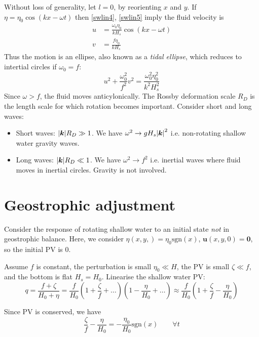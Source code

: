 \documentclass{jknotes}
\newcommand{\sgn}{\text{sgn}}
\begin{document}
Without loss of generality, let $l = 0$, by reorienting $x$ and $y$. If $\eta
= \eta_0 \cos(kx-\omega t)$ then \eqref{swlin4}, \eqref{swlin5} imply the
fluid velocity is
\begin{align}
	u &= \frac{\omega_0 \eta_0}{k H_s} \cos(kx-\omega t) \\
	v &= \frac{f \eta_0}{k H_s}
\end{align}
Thus the motion is an ellipse, also known as a \emph{tidal ellipse}, which
reduces to intertial circles if $\omega_0 = f$:
\begin{equation}
	u^2 + \frac{\omega_0^2}{f^2} v^2 = \frac{\omega_0^2 \eta_0^2}{k^2 H_s^2}
\end{equation}
Since $\omega > f$, the fluid moves anticylonically. The Rossby deformation
scale $R_D$ is the length scale for which rotation becomes important. Consider
short and long waves:
\begin{itemize}
	\item Short waves: $\abs{\bm{k}} R_D \gg 1$. We have $\omega^2 \to g H_s
		\abs{\bm{k}}^2$ i.e. non-rotating shallow water gravity waves.
	\item Long waves: $\abs{\bm{k}}R_D \ll 1$. We have $\omega^2 \to f^2$ i.e.
		inertial waves where fluid moves in inertial circles. Gravity is not
		involved.
\end{itemize}

\section{Geostrophic adjustment}
Consider the response of rotating shallow water to an initial state \emph{not}
in geostrophic balance. Here, we consider $\eta(x,y,) = \eta_0 \sgn(x)$,
$\bm{u}(x,y,0) = \bm{0}$, so the initial PV is $0$. 


Assume $f$ is constant, the perturbation is small $\eta_0 \ll H$, the PV is
small $\zeta \ll f$, and the bottom is flat $H_s = H_0$. Linearise the shallow
water PV:
\begin{equation}
	q = \frac{f+\zeta}{H_0+\eta} = \frac{f}{H_0}\left(1+\frac{\zeta}{f} +
		\dots\right)\left(1-\frac{\eta}{H_0}+\dots\right) \approx
		\frac{f}{H_0}\left(1+\frac{\zeta}{f} - \frac{\eta}{H_0}\right)
\end{equation}

Since PV is conserved, we have
\begin{equation}
	\frac{\zeta}{f} - \frac{\eta}{H_0} = -\frac{\eta_0}{H_0} \sgn(x)
	\hspace{2em} \forall t \label{eq:PVcons}
\end{equation}
\end{document}
